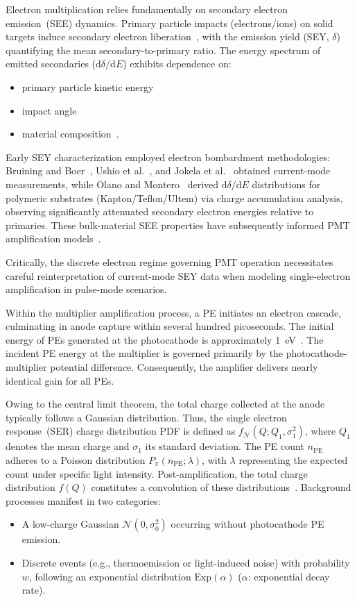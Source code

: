 Electron multiplication relies fundamentally on secondary electron emission~(SEE) dynamics. Primary particle impacts (electrons/ions) on solid targets induce secondary electron liberation~\cite{2016Secondary}, with the emission yield (SEY, $\delta$) quantifying the mean secondary-to-primary ratio. The energy spectrum of emitted secondaries ($\mathrm{d}\delta/\mathrm{d}E$) exhibits dependence on:
\begin{itemize}
	\item primary particle kinetic energy
	\item impact angle
	\item material composition~\cite{2002Probabilistic}.
\end{itemize}

Early SEY characterization employed electron bombardment methodologies: Bruining and Boer~\cite{1938Secondary}, Ushio et al.~\cite{1988Secondary}, and Jokela et al.~\cite{2012Secondary} obtained current-mode measurements, while Olano and Montero~\cite{OLANO2020103456} derived $\mathrm{d}\delta/\mathrm{d}E$ distributions for polymeric substrates (Kapton/Teflon/Ultem) via charge accumulation analysis, observing significantly attenuated secondary electron energies relative to primaries. These bulk-material SEE properties have subsequently informed PMT amplification models~\cite{2012An,2021Effects}.

Critically, the discrete electron regime governing PMT operation necessitates careful reinterpretation of current-mode SEY data when modeling single-electron amplification in pulse-mode scenarios.

Within the multiplier amplification process, a PE initiates an electron cascade, culminating in anode capture within several hundred picoseconds. The initial energy of PEs generated at the photocathode is approximately \SI{1}{eV}~\cite{Nathan1970TheED}. The incident PE energy at the multiplier is governed primarily by the photocathode-multiplier potential difference. Consequently, the amplifier delivers nearly identical gain for all PEs.

Owing to the central limit theorem, the total charge collected at the anode typically follows a Gaussian distribution. Thus, the single electron response~(SER) charge distribution PDF is defined as $ f_{\mathcal{N}}(Q; Q_1,\sigma_1^2) $, where $ Q_1 $ denotes the mean charge and $ \sigma_1 $ its standard deviation. The PE count $ n_{\mathrm{PE}} $ adheres to a Poisson distribution $ P_\pi(n_{\mathrm{PE}};\lambda) $, with $ \lambda $ representing the expected count under specific light intensity. Post-amplification, the total charge distribution $ f(Q) $ constitutes a convolution of these distributions~\cite{1994Absolute}. Background processes manifest in two categories:
\begin{itemize}
	\item A low-charge Gaussian $ \mathcal{N}(0,\sigma_0^2) $ occurring without photocathode PE emission.
	\item Discrete events (e.g., thermoemission or light-induced noise) with probability $ w $, following an exponential distribution $ \mathrm{Exp}(\alpha) $ ($\alpha$: exponential decay rate).
\end{itemize}

